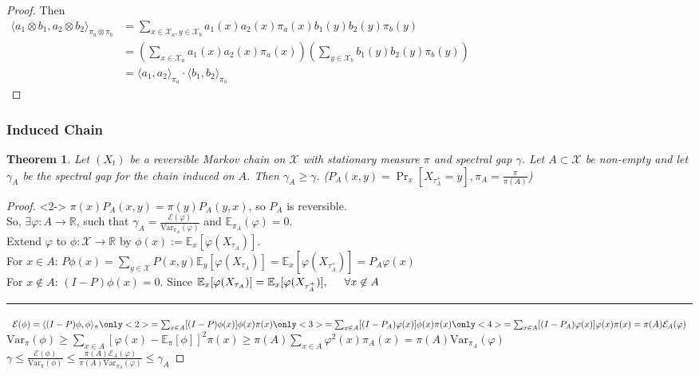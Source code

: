 \documentclass{beamer}
\newtheorem{thm}{Theorem}
\def\<{\langle}
\def\>{\rangle}
\def\Var{\mathrm{Var}}
\def\E{\mathbb{E}}
\begin{document}
\begin{frame}[t]
{\begin{proof}
      Then \\
      $ \begin{array}{ll}
          \<a_1 \otimes b_1, a_2 \otimes b_2\>_{\pi_a\otimes\pi_b}
          &= \sum_{x\in \mathcal{X}_a, y\in\mathcal{X}_b}a_1(x)a_2(x)\pi_a(x) b_1(y)b_2(y)\pi_b(y) \\
          &= \left(\sum_{x\in\mathcal{X}_a}a_1(x)a_2(x)\pi_a(x)\right)\left(\sum_{y\in\mathcal{X}_b}b_1(y)b_2(y)\pi_b(y)\right)\\
          &= \<a_1, a_2\>_{\pi_a} \cdot \<b_1, b_2\>_{\pi_b}
        \end{array} $ \\
    \end{proof}
  }
\end{frame}

\begin{frame}[t]
  \scriptsize
  \frametitle{Induced Chain}
  \begin{thm}
    Let $(X_t)$ be a reversible Markov chain on $\mathcal{X}$ with stationary measure $\pi$ and spectral gap $\gamma$.
    Let $A\subset \mathcal{X}$ be non-empty and let $\gamma_A$ be the spectral gap for the chain induced on $A$.
    Then $\gamma_A \geq \gamma$. ($P_A(x,y) = \Pr_x[X_{\tau_A^+} = y], \pi_A = \frac{\pi}{\pi(A)}$)
  \end{thm}
  \begin{proof}<2->
    $\pi(x)P_A(x,y) = \pi(y)P_A(y, x)$, so $P_A$ is reversible. \\
    So, $\exists \varphi : A \to \mathbb{R}$, such that $\gamma_A = \frac{\mathcal{E}(\varphi)}{\Var_{\pi_A}(\varphi)}$ and $\E_{\pi_A}(\varphi) = 0$. \\
    Extend $\varphi$ to $\phi : \mathcal{X} \to \mathbb{R}$ by $\phi(x) := \E_x[\varphi(X_{\tau_A})].$ \\
    For $x\in A$: $P\phi(x) = \sum_{y\in\mathcal{X}}P(x,y)\E_y[\varphi(X_{\tau_A})] = \E_x[\varphi(X_{\tau_A^+})] = P_A\varphi(x)$ \\
    For $x\not\in A$: $(I-P)\phi(x) = 0$. Since $\E_x[\varphi(X_{\tau_A})] = \E_x[\varphi(X_{\tau_A^+})], \hspace{0.5cm} \forall x\not\in A$ \\
    \vspace{1mm}
    \hrule
    \vspace{1mm}
    $ \begin{array}{ll}
      \mathcal{E}(\phi) = \<(I - P)\phi, \phi\>_\pi
      \only<2>{= \sum_{x\in A} [(I - P)\phi(x)]\phi(x)\pi(x)}
      \only<3>{= \sum_{x\in A} [(I - P_A)\varphi(x)]\phi(x)\pi(x)}
      \only<4>{= \sum_{x\in A} [(I - P_A)\varphi(x)]\varphi(x)\pi(x)} = \pi(A)\mathcal{E}_A(\varphi)
    \end{array} $ \\
    $\Var_\pi(\phi) \geq \sum_{x\in A}[\varphi(x) - \E_\pi[\phi]]^2\pi(x) \geq \pi(A) \sum_{x\in A}\varphi^2(x)\pi_A(x)
    = \pi(A)\Var_{\pi_A}(\varphi)$ \\
    $\gamma \leq \frac{\mathcal{E}(\phi)}{\Var_\pi(\phi)} \leq \frac{\pi(A)\mathcal{E}_A(\varphi)}{\pi(A)\Var_{\pi_A}(\varphi)} \leq \gamma_A$
  \end{proof}
\end{frame}
\end{document}
